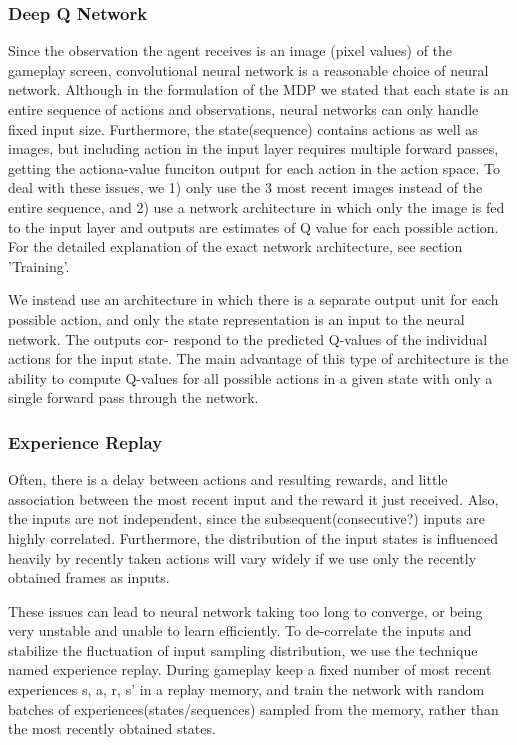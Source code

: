 \documentclass{article}
\begin{document}
\begin{multicols}{2}
\subsubsection{Deep Q Network}

Since the observation the agent receives is an image (pixel values) of the gameplay screen, convolutional neural network is a reasonable choice of neural network. Although in the formulation of the MDP we stated that each state is an entire sequence of actions and observations, neural networks can only handle fixed input size. Furthermore, the state(sequence) contains actions as well as images, but including action in the input layer requires multiple forward passes, getting the actiona-value funciton output for each action in the action space. To deal with these issues, we 1) only use the 3 most recent images instead of the entire sequence, and 2) use a network architecture in which only the image is fed to the input layer and outputs are estimates of Q value for each possible action. For the detailed explanation of the exact network architecture, see section 'Training'.

We instead use an architecture in which there is a separate output unit for each possible action, and only the state representation is an input to the neural network. The outputs cor- respond to the predicted Q-values of the individual actions for the input state. The main advantage of this type of architecture is the ability to compute Q-values for all possible actions in a given state with only a single forward pass through the network.

\subsubsection{Experience Replay}

Often, there is a delay between actions and resulting rewards, and little association between the most recent input and the reward it just received. Also, the inputs are not independent, since the subsequent(consecutive?) inputs are highly correlated. Furthermore, the distribution of the input states is influenced heavily by recently taken actions will vary widely if we use only the recently obtained frames as inputs.

These issues can lead to neural network taking too long to converge, or being very unstable and unable to learn efficiently. To de-correlate the inputs and stabilize the fluctuation of input sampling distribution, we use the technique named experience replay. During gameplay keep a fixed number of most recent experiences {s, a, r, s'} in a replay memory, and train the network with random batches of experiences(states/sequences) sampled from the memory, rather than the most recently obtained states.


\end{multicols}
\end{document}
